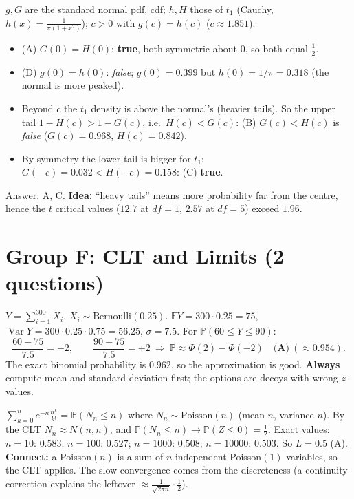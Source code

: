 \documentclass[11pt,a4paper]{article}
\newcommand{\E}{\mathbb{E}}
\newcommand{\Var}{\operatorname{Var}}
\renewcommand{\Pr}{\mathbb{P}}
\begin{document}
\begin{example}
$g,G$ are the standard normal pdf, cdf; $h,H$ those of $t_1$ (Cauchy, $h(x)=\frac1{\pi(1+x^2)}$); $c>0$ with $g(c)=h(c)$ ($c\approx1.851$).
\begin{itemize}[noitemsep]
\item (A) $G(0)=H(0)$: \textbf{true}, both symmetric about $0$, so both equal $\tfrac12$.
\item (D) $g(0)=h(0)$: \emph{false}; $g(0)=0.399$ but $h(0)=1/\pi=0.318$ (the normal is more peaked).
\item Beyond $c$ the $t_1$ density is above the normal's (heavier tails). So the upper tail $1-H(c)>1-G(c)$, i.e.\ $H(c)<G(c)$: (B) $G(c)<H(c)$ is \emph{false} ($G(c)=0.968$, $H(c)=0.842$).
\item By symmetry the lower tail is bigger for $t_1$: $G(-c)=0.032<H(-c)=0.158$: (C) \textbf{true}.
\end{itemize}
Answer: A, C. \textbf{Idea:} ``heavy tails'' means more probability far from the centre, hence the $t$ critical values ($12.7$ at $df=1$, $2.57$ at $df=5$) exceed $1.96$.
\end{example}

\section{Group F: CLT and Limits (2 questions)}

\begin{example}
$Y=\sum_{i=1}^{300}X_i$, $X_i\sim\text{Bernoulli}(0.25)$. $\E Y=300\cdot0.25=75$, $\Var Y=300\cdot0.25\cdot0.75=56.25$, $\sigma=7.5$. For $\Pr(60\le Y\le90)$:
\[\frac{60-75}{7.5}=-2,\qquad\frac{90-75}{7.5}=+2\ \Rightarrow\ \Pr\approx\Phi(2)-\Phi(-2)\quad\textbf{(A)}\ (\approx0.954).\]
The exact binomial probability is $0.962$, so the approximation is good. \textbf{Always} compute mean and standard deviation first; the options are decoys with wrong $z$-values.
\end{example}

\begin{example}
$\sum_{k=0}^ne^{-n}\frac{n^k}{k!}=\Pr(N_n\le n)$ where $N_n\sim\text{Poisson}(n)$ (mean $n$, variance $n$). By the CLT $N_n\approx N(n,n)$, and $\Pr(N_n\le n)\to\Pr(Z\le0)=\tfrac12$. Exact values: $n=10$: $0.583$; $n=100$: $0.527$; $n=1000$: $0.508$; $n=10000$: $0.503$. So $L=\mathbf{0.5}$ \quad (A).\\
\textbf{Connect:} a Poisson$(n)$ is a sum of $n$ independent Poisson$(1)$ variables, so the CLT applies. The slow convergence comes from the discreteness (a continuity correction explains the leftover $\approx\frac{1}{\sqrt{2\pi n}}\cdot\frac12$).
\end{example}
\end{document}
